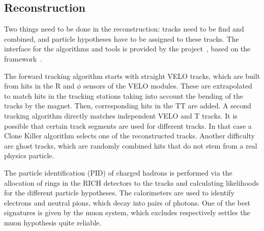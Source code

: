 
\subsection{Reconstruction}
\label{sec:detector:software:reconstruction}

Two things need to be done in the reconstruction: tracks need to be find and
combined, and particle hypotheses have to be assigned to these tracks. The
interface for the algorithms and tools is provided by the \brunel
project~\cite{Brunel}, based on the \gaudi framework~\cite{Barrand:2001ny}.

The forward tracking algorithm starts with straight VELO tracks, which are
built from hits in the R and $\phi$ sensors of the VELO modules. These are
extrapolated to match hits in the tracking stations taking into account the
bending of the tracks by the magnet. Then, corresponding hits in the TT are
added. A second tracking algorithm directly matches independent VELO and T
tracks. It is possible that certain track segments are used for different
tracks. In that case a Clone Killer algorithm selects one of the reconstructed
tracks. Another difficulty are ghost tracks, which are randomly combined hits
that do not stem from a real physics particle.

The particle identification (PID) of charged hadrons is performed via the allocation
of rings in the RICH detectors to the tracks and calculating likelihoods for
the different particle hypotheses. The calorimeters are used to identify
electrons and neutral pions, which decay into pairs of photons. One of the
best signatures is given by the muon system, which excludes respectively
settles the muon hypothesis quite reliable.